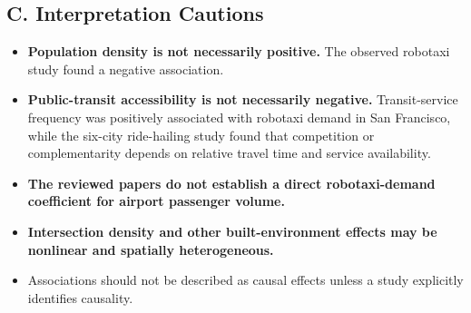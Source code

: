 \documentclass[10pt,a4paper]{article}
\providecommand{\tightlist}{\setlength{\itemsep}{0pt}\setlength{\parskip}{0pt}}
\begin{document}
\hypertarget{c.-interpretation-cautions}{%
\subsection{C. Interpretation Cautions}\label{c.-interpretation-cautions}}

\begin{itemize}
\tightlist
\item
  \textbf{Population density is not necessarily positive.} The observed robotaxi study found a negative association.
\item
  \textbf{Public-transit accessibility is not necessarily negative.} Transit-service frequency was positively associated with robotaxi demand in San Francisco, while the six-city ride-hailing study found that competition or complementarity depends on relative travel time and service availability.
\item
  \textbf{The reviewed papers do not establish a direct robotaxi-demand coefficient for airport passenger volume.}
\item
  \textbf{Intersection density and other built-environment effects may be nonlinear and spatially heterogeneous.}
\item
  Associations should not be described as causal effects unless a study explicitly identifies causality.
\end{itemize}
\end{document}
